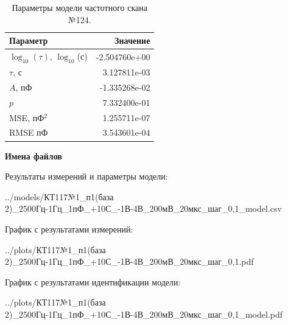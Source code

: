 \begin{table}[!ht]
    \centering
    \caption{Параметры модели частотного скана №124.}
    \begin{tabular}{|l|r|}
        \hline
        Параметр                                       & Значение                  \\ \hline
        $\log_{10}(\tau)$, $\log_{10}$(с)              & -2.504760e+00             \\ \hline
        $\tau$, с                                      & 3.127811e-03              \\ \hline
        $A$, пФ                                        & -1.335268e-02             \\ \hline
        $p$                                            & 7.332400e-01              \\ \hline
        MSE, пФ$^2$                                    & 1.255711e-07              \\ \hline
        RMSE пФ                                        & 3.543601e-04              \\ \hline
    \end{tabular}
    \label{table:frequency_scan_model_124}
\end{table}

\textbf{Имена файлов}

Результаты измерений и параметры модели:

\scriptsize../models/КТ117№1\_п1(база 2)\_2500Гц-1Гц\_1пФ\_+10С\_-1В-4В\_200мВ\_20мкс\_шаг\_0,1\_model.csv
\normalsize

График с результатами измерений:

\scriptsize../plots/КТ117№1\_п1(база 2)\_2500Гц-1Гц\_1пФ\_+10С\_-1В-4В\_200мВ\_20мкс\_шаг\_0,1.pdf
\normalsize

График с результатами идентификации модели:

\scriptsize../plots/КТ117№1\_п1(база 2)\_2500Гц-1Гц\_1пФ\_+10С\_-1В-4В\_200мВ\_20мкс\_шаг\_0,1\_model.pdf
\normalsize

